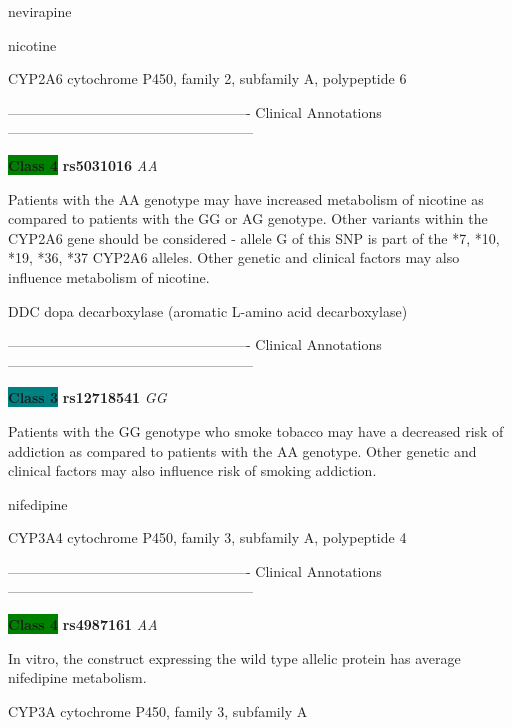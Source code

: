 \documentclass{resume} %
\begin{document}
\begin{rSection}{ nevirapine }
\end{rSection}\begin{rSection}{ nicotine }
\item[]

\begin{rSubsection}{ CYP2A6 }{ cytochrome P450, family 2, subfamily A, polypeptide 6 }{}{}
\item[]

\item[] ---------------------------------------------------- Clinical Annotations -----------------------------------------------------\newline
\item \textbf{\colorbox{green} {Class 4}} \textbf{ rs5031016 } \textit{ AA }
\item[] Patients with the AA genotype may have increased metabolism of nicotine as compared to patients with the GG or AG genotype. Other variants within the CYP2A6 gene should be considered - allele G of this SNP is part of the *7, *10, *19, *36, *37 CYP2A6 alleles. Other genetic and clinical factors may also influence metabolism of nicotine.
\end{rSubsection}\begin{rSubsection}{ DDC }{ dopa decarboxylase (aromatic L-amino acid decarboxylase) }{}{}
\item[]

\item[] ---------------------------------------------------- Clinical Annotations -----------------------------------------------------\newline
\item \textbf{\colorbox{teal} {Class 3}} \textbf{ rs12718541 } \textit{ GG }
\item[] Patients with the GG genotype who smoke tobacco may have a decreased risk of addiction as compared to patients with the AA genotype. Other genetic and clinical factors may also influence risk of smoking addiction.
\end{rSubsection}

\end{rSection}\begin{rSection}{ nifedipine }
\item[]

\begin{rSubsection}{ CYP3A4 }{ cytochrome P450, family 3, subfamily A, polypeptide 4 }{}{}
\item[]

\item[] ---------------------------------------------------- Clinical Annotations -----------------------------------------------------\newline
\item \textbf{\colorbox{green} {Class 4}} \textbf{ rs4987161 } \textit{ AA }
\item[] In vitro, the construct expressing the wild type allelic protein has average nifedipine metabolism.
\end{rSubsection}\begin{rSubsection}{ CYP3A }{ cytochrome P450, family 3, subfamily A }{}{}
\item[]


\end{rSubsection}
\end{rSection}
\end{document}
